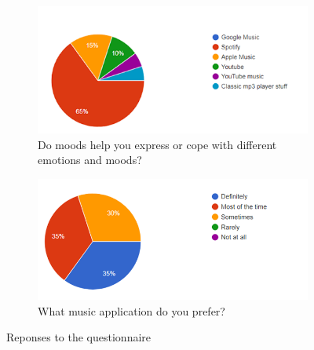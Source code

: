 \documentclass[10pt]{report}
\begin{document}
\newpage

\begin{figure}[h]
\centering
\begin{subfigure}{\textwidth}
	\centering	
	\includegraphics[width=0.9\linewidth]{question-moods.png}
	\caption{Do moods help you express or cope with different emotions and moods?}
	\label{fig:question-moods}
\end{subfigure}
\begin{subfigure}{\textwidth}
	\centering
	\includegraphics[width=0.9\linewidth]{question-format.png}
	\caption{What music application do you prefer?}
	\label{fig:question-format}
\end{subfigure}

\caption{Reponses to the questionnaire}
\label{fig:question}

\end{figure}

\newpage
\end{document}
